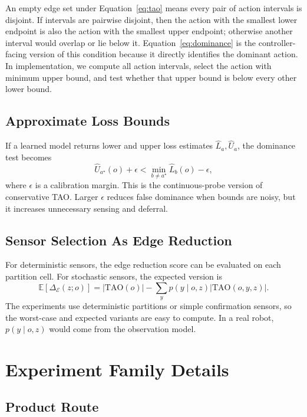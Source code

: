 \documentclass{article}
\newcommand{\edges}{\mathcal{E}}
\newcommand{\tao}{\mathrm{TAO}}
\begin{document}
An empty edge set under Equation~\ref{eq:tao} means every pair of action intervals is disjoint. If intervals are pairwise disjoint, then the action with the smallest lower endpoint is also the action with the smallest upper endpoint; otherwise another interval would overlap or lie below it. Equation~\ref{eq:dominance} is the controller-facing version of this condition because it directly identifies the dominant action. In implementation, we compute all action intervals, select the action with minimum upper bound, and test whether that upper bound is below every other lower bound.

\subsection{Approximate Loss Bounds}

If a learned model returns lower and upper loss estimates $\hat{L}_a,\hat{U}_a$, the dominance test becomes
\begin{equation}
  \hat{U}_{a^\star}(o) + \epsilon < \min_{b\neq a^\star} \hat{L}_b(o) - \epsilon,
\end{equation}
where $\epsilon$ is a calibration margin. This is the continuous-probe version of conservative TAO. Larger $\epsilon$ reduces false dominance when bounds are noisy, but it increases unnecessary sensing and deferral.

\subsection{Sensor Selection As Edge Reduction}

For deterministic sensors, the edge reduction score can be evaluated on each partition cell. For stochastic sensors, the expected version is
\begin{equation}
  \mathbb{E}[\Delta_{\edges}(z;o)]
  =
  |\tao(o)| -
  \sum_y p(y\mid o,z) |\tao(o,y,z)|.
\end{equation}
The experiments use deterministic partitions or simple confirmation sensors, so the worst-case and expected variants are easy to compute. In a real robot, $p(y\mid o,z)$ would come from the observation model.

\section{Experiment Family Details}

\subsection{Product Route}
\end{document}

